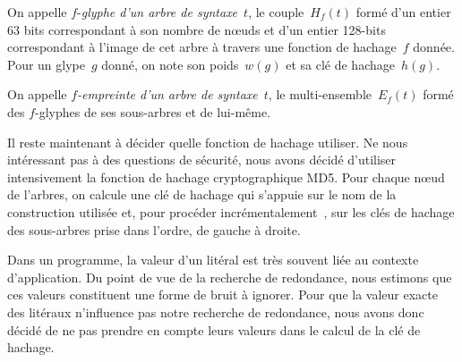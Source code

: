 \begin{defn}
On appelle $f$-\textit{glyphe d'un arbre de syntaxe}~$t$, le
couple~$H_f(t)$ formé d'un entier 63 bits correspondant à son nombre
de n{\oe}uds et d'un entier 128-bits correspondant à l'image de cet
arbre à travers une fonction de hachage~$f$ donnée. Pour un glype~$g$
donné, on note son poids~$w(g)$ et sa clé de hachage~$h(g)$.
\end{defn}


\begin{defn}
On appelle \textit{$f$-empreinte d'un arbre de syntaxe}~$t$, le
multi-ensemble~$E_f(t)$ formé des $f$-glyphes de ses sous-arbres
et de lui-même.
\end{defn}

Il reste maintenant à décider quelle fonction de hachage utiliser. Ne
nous intéressant pas à des questions de sécurité, nous avons décidé
d'utiliser intensivement la fonction de hachage cryptographique
MD5. Pour chaque n{\oe}ud de l'arbres, on calcule une clé de hachage
qui s'appuie sur le nom de la construction utilisée et, pour procéder
incrémentalement~\cite{DBLP:conf/ml/FilliatreC06}, sur les clés de
hachage des sous-arbres prise dans l'ordre, de gauche à droite.

Dans un programme, la valeur d'un litéral est très souvent liée au
contexte d'application. Du point de vue de la recherche de redondance, nous
estimons que ces valeurs constituent une forme de bruit à ignorer.
Pour que la valeur exacte des litéraux n'influence pas notre recherche
de redondance, nous avons donc décidé de ne pas prendre en compte leurs
valeurs dans le calcul de la clé de hachage.


